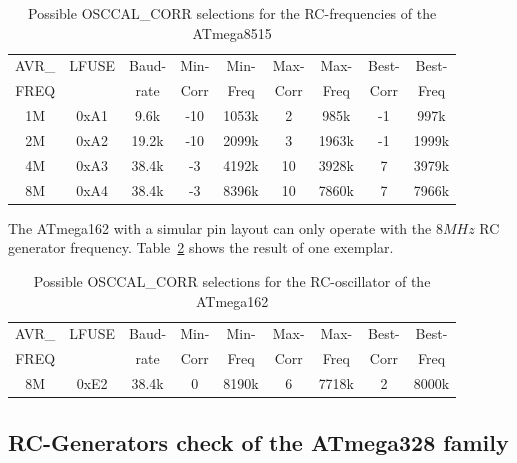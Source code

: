 \begin{table}[H]
  \begin{center}
    \begin{tabular}{| c | c | c || c | c || c | c || c | c |}
    \hline
             AVR\_ & LFUSE & Baud- & Min- & Min- & Max- & Max- & Best- & Best-  \\
             FREQ  &       & rate & Corr & Freq & Corr & Freq  & Corr  & Freq  \\
    \hline
    \hline
                1M & 0xA1  &  9.6k &  -10  & 1053k &  2  & 985k  & -1  & 997k \\
    \hline
                2M & 0xA2  & 19.2k &  -10  & 2099k &  3  & 1963k & -1  & 1999k \\
    \hline
                4M & 0xA3  & 38.4k &  -3  & 4192k &  10  & 3928k & 7  & 3979k \\
    \hline
                8M & 0xA4  & 38.4k &  -3  & 8396k &  10  & 7860k & 7  & 7966k \\
    \hline
    \end{tabular}
  \end{center}
  \caption{Possible OSCCAL\_CORR selections for the RC-frequencies of the ATmega8515}
  \label{tab:mega8515freq}
\end{table}

The ATmega162 with a simular pin layout can only operate with the
\(8MHz\) RC generator frequency.
Table~\ref{tab:mega162freq} shows the result of one exemplar.

\begin{table}[H]
  \begin{center}
    \begin{tabular}{| c | c | c || c | c || c | c || c | c |}
    \hline
             AVR\_ & LFUSE & Baud- & Min- & Min- & Max- & Max- & Best- & Best-  \\
             FREQ  &       & rate & Corr & Freq & Corr & Freq  & Corr  & Freq  \\
    \hline
    \hline
                8M & 0xE2  & 38.4k &  0  & 8190k &   6  & 7718k & 2  & 8000k \\
    \hline
    \end{tabular}
  \end{center}
  \caption{Possible OSCCAL\_CORR selections for the RC-oscillator of the ATmega162}
  \label{tab:mega162freq}
\end{table}


\subsection{RC-Generators check of the ATmega328 family}

